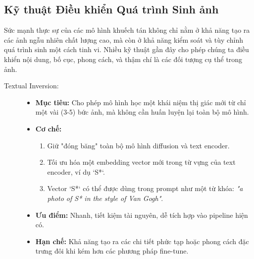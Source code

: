 \subsection{Kỹ thuật Điều khiển Quá trình Sinh ảnh}
\label{subsec:diffusion_control_techniques}

Sức mạnh thực sự của các mô hình khuếch tán không chỉ nằm ở khả năng tạo ra các ảnh ngẫu nhiên chất lượng cao, mà còn ở khả năng kiểm soát và tùy chỉnh quá trình sinh một cách tinh vi. Nhiều kỹ thuật gần đây cho phép chúng ta điều khiển nội dung, bố cục, phong cách, và thậm chí là các đối tượng cụ thể trong ảnh.

\begin{description}
	\item[Textual Inversion:] \cite{Gal2022_textual} 
	\begin{itemize}
		\item \textbf{Mục tiêu:} Cho phép mô hình học một khái niệm thị giác mới từ chỉ một vài (3-5) bức ảnh, mà không cần huấn luyện lại toàn bộ mô hình.
		\item \textbf{Cơ chế:} 
		\begin{enumerate}
			\item Giữ "đóng băng" toàn bộ mô hình diffusion và text encoder.
			\item Tối ưu hóa một embedding vector mới trong từ vựng của text encoder, ví dụ `S*`.
			\item Vector `S*` có thể được dùng trong prompt như một từ khóa: \textit{"a photo of S* in the style of Van Gogh"}.
		\end{enumerate}
		\item \textbf{Ưu điểm:} Nhanh, tiết kiệm tài nguyên, dễ tích hợp vào pipeline hiện có.
		\item \textbf{Hạn chế:} Khả năng tạo ra các chi tiết phức tạp hoặc phong cách đặc trưng đôi khi kém hơn các phương pháp fine-tune.
	\end{itemize}
	

\end{description}

